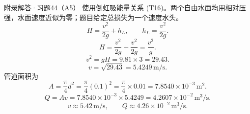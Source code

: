 \documentclass[aspectratio=169,10pt]{beamer}
\begin{document}
\begin{frame}{附录解答·习题44（A5）}
  \footnotesize
  使用倒虹吸能量关系 (T16)。两个自由水面均用相对压强，水面速度近似为零；题目给定总损失为一个速度水头。
  \[
    H=\frac{v^2}{2g}+h_L,
    \qquad
    h_L=\frac{v^2}{2g}.
  \]
  \[
    H=\frac{v^2}{2g}+\frac{v^2}{2g}
    =\frac{v^2}{g}.
  \]
  \[
    v^2=gH=9.81\times3=29.43.
  \]
  \[
    v=\sqrt{29.43}=5.4249\,\mathrm{m/s}.
  \]
  管道面积为
  \[
    A=\frac{\pi}{4}d^2
    =\frac{\pi}{4}(0.1)^2
    =\frac{\pi}{4}\times0.01
    =7.8540\times10^{-3}\,\mathrm{m^2}.
  \]
  \[
    Q=Av
    =7.8540\times10^{-3}\times5.4249
    =4.2607\times10^{-2}\,\mathrm{m^3/s}.
  \]
  \[
    \boxed{v\approx5.42\,\mathrm{m/s},\qquad Q\approx4.26\times10^{-2}\,\mathrm{m^3/s}.}
  \]
\end{frame}
\end{document}
